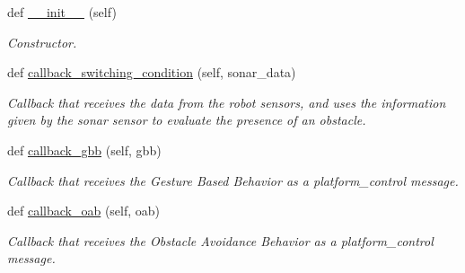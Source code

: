 \begin{DoxyCompactItemize}
\item 
\mbox{\label{classswitching__behavior__miro_1_1SwitchingBehavior_a7ff242a8b8e3f6aa161760f8a1111410}} 
def \mbox{\hyperlink{classswitching__behavior__miro_1_1SwitchingBehavior_a7ff242a8b8e3f6aa161760f8a1111410}{\+\_\+\+\_\+init\+\_\+\+\_\+}} (self)
\begin{DoxyCompactList}\small\item\em Constructor. \end{DoxyCompactList}\item 
\mbox{\label{classswitching__behavior__miro_1_1SwitchingBehavior_aa2ec67fcfd236ad1be80f5085dd1aa21}} 
def \mbox{\hyperlink{classswitching__behavior__miro_1_1SwitchingBehavior_aa2ec67fcfd236ad1be80f5085dd1aa21}{callback\+\_\+switching\+\_\+condition}} (self, sonar\+\_\+data)
\begin{DoxyCompactList}\small\item\em Callback that receives the data from the robot sensors, and uses the information given by the sonar sensor to evaluate the presence of an obstacle. \end{DoxyCompactList}\item 
\mbox{\label{classswitching__behavior__miro_1_1SwitchingBehavior_ae563101974a52b61eb45cdf6dfb9e4e8}} 
def \mbox{\hyperlink{classswitching__behavior__miro_1_1SwitchingBehavior_ae563101974a52b61eb45cdf6dfb9e4e8}{callback\+\_\+gbb}} (self, gbb)
\begin{DoxyCompactList}\small\item\em Callback that receives the Gesture Based Behavior as a platform\+\_\+control message. \end{DoxyCompactList}\item 
\mbox{\label{classswitching__behavior__miro_1_1SwitchingBehavior_a224069e95b06f6eaa28448a6020f93ea}} 
def \mbox{\hyperlink{classswitching__behavior__miro_1_1SwitchingBehavior_a224069e95b06f6eaa28448a6020f93ea}{callback\+\_\+oab}} (self, oab)
\begin{DoxyCompactList}\small\item\em Callback that receives the Obstacle Avoidance Behavior as a platform\+\_\+control message. \end{DoxyCompactList}\item 

\end{DoxyCompactItemize}
